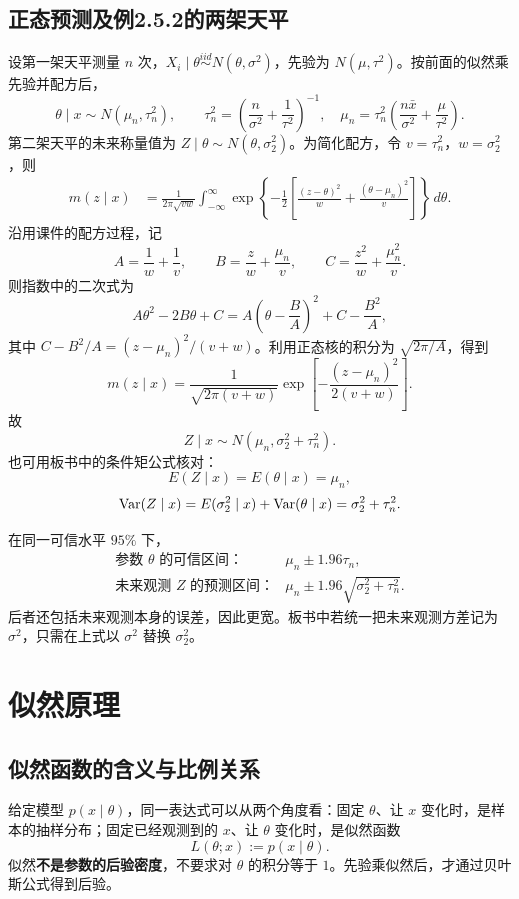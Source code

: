 \subsection{正态预测及例2.5.2的两架天平}
设第一架天平测量 $n$ 次，$X_i\mid\theta\overset{iid}{\sim}N(\theta,\sigma^2)$，先验为 $N(\mu,\tau^2)$。按前面的似然乘先验并配方后，
\[
\theta\mid x\sim N(\mu_n,\tau_n^2),\qquad
\tau_n^2=\left(\frac n{\sigma^2}+\frac1{\tau^2}\right)^{-1},\quad
\mu_n=\tau_n^2\left(\frac{n\bar x}{\sigma^2}+\frac\mu{\tau^2}\right).
\]
第二架天平的未来称量值为 $Z\mid\theta\sim N(\theta,\sigma_2^2)$。为简化配方，令 $v=\tau_n^2$，$w=\sigma_2^2$，则
\begin{align*}
m(z\mid x)
&=\frac1{2\pi\sqrt{vw}}\int_{-\infty}^{\infty}
\exp\left\{-\frac12\left[\frac{(z-\theta)^2}{w}
+\frac{(\theta-\mu_n)^2}{v}\right]\right\}\,d\theta.
\end{align*}
沿用课件的配方过程，记
\[
A=\frac1w+\frac1v,\qquad B=\frac zw+\frac{\mu_n}v,\qquad
C=\frac{z^2}w+\frac{\mu_n^2}v.
\]
则指数中的二次式为
\[
A\theta^2-2B\theta+C
=A\left(\theta-\frac BA\right)^2+C-\frac{B^2}A,
\]
其中 $C-B^2/A=(z-\mu_n)^2/(v+w)$。利用正态核的积分为 $\sqrt{2\pi/A}$，得到
\[
m(z\mid x)=\frac1{\sqrt{2\pi(v+w)}}
\exp\left[-\frac{(z-\mu_n)^2}{2(v+w)}\right].
\]
故
\[
\boxed{Z\mid x\sim N(\mu_n,\sigma_2^2+\tau_n^2).}
\]
也可用板书中的条件矩公式核对：
\[
E(Z\mid x)=E(\theta\mid x)=\mu_n,
\]
\[
\operatorname{Var}(Z\mid x)=E(\sigma_2^2\mid x)+\operatorname{Var}(\theta\mid x)
=\sigma_2^2+\tau_n^2.
\]

在同一可信水平 $95\%$ 下，
\[
\begin{array}{ll}
\text{参数 }\theta\text{ 的可信区间：}&\mu_n\pm1.96\tau_n,\\[3pt]
\text{未来观测 }Z\text{ 的预测区间：}&\mu_n\pm1.96\sqrt{\sigma_2^2+\tau_n^2}.
\end{array}
\]
后者还包括未来观测本身的误差，因此更宽。板书中若统一把未来观测方差记为 $\sigma^2$，只需在上式以 $\sigma^2$ 替换 $\sigma_2^2$。

\section{似然原理}
\subsection{似然函数的含义与比例关系}
给定模型 $p(x\mid\theta)$，同一表达式可以从两个角度看：固定 $\theta$、让 $x$ 变化时，是样本的抽样分布；固定已经观测到的 $x$、让 $\theta$ 变化时，是似然函数
\[
L(\theta;x):=p(x\mid\theta).
\]
似然\textbf{不是参数的后验密度}，不要求对 $\theta$ 的积分等于 $1$。先验乘似然后，才通过贝叶斯公式得到后验。


